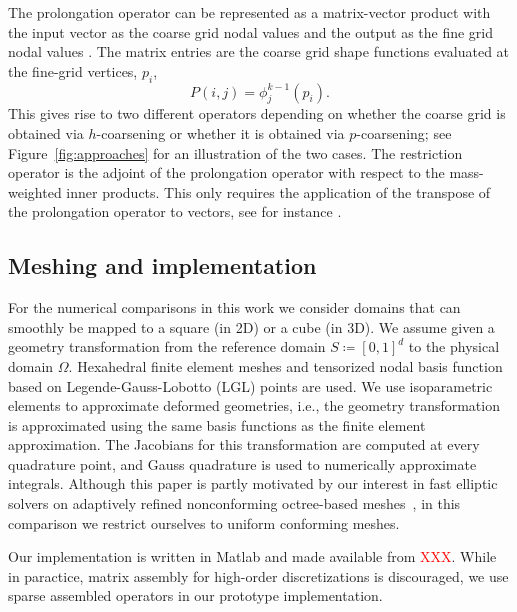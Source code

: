 \documentclass[smallcondensed,final]{svjour3}     %
\newcommand{\todo}[1]{\textcolor{red}{ #1}}
\begin{document}
The prolongation operator can be represented as a matrix-vector
product with the input vector as the coarse grid nodal values and the
output as the fine grid nodal values \cite{SampathBiros10}. The matrix
entries are the coarse grid shape functions evaluated at the fine-grid
vertices, $p_i$,
\begin{equation}
	\label{eq:Pstencil}
	P(i,j) = \phi_j^{k-1}(p_i). 
\end{equation}
This gives rise to two different operators depending on whether the
coarse grid is obtained via $h$-coarsening or whether it is obtained
via $p$-coarsening; see Figure~\ref{fig:approaches} for an
illustration of the two cases. The restriction operator is the adjoint
of the prolongation operator with respect to the mass-weighted inner
products. This only requires the application of the transpose of the
prolongation operator to vectors, see for instance
\cite{SampathBiros10}.


\subsection{Meshing and implementation} %
\label{sub:meshing}

For the numerical comparisons in this work we consider domains that
can smoothly be mapped to a square (in 2D) or a cube (in 3D). We
assume given a geometry transformation from the reference domain
$S\coloneqq[0,1]^d$ to the physical domain $\Omega$. Hexahedral finite
element meshes and tensorized nodal basis function based on
Legende-Gauss-Lobotto (LGL) points are used.  We use isoparametric
elements to approximate deformed geometries, i.e., the geometry
transformation is approximated using the same basis functions as the
finite element approximation. The Jacobians for this transformation
are computed at every quadrature point, and Gauss quadrature is used
to numerically approximate integrals.  Although this paper is partly
motivated by our interest in fast elliptic solvers on adaptively
refined nonconforming octree-based
meshes~\cite{SundarBirosBursteddeEtAl12, SampathBiros10}, in this
comparison we restrict ourselves to uniform conforming meshes.

Our implementation is written in Matlab and made available from
\todo{XXX}. While in paractice, matrix assembly for
high-order discretizations is discouraged, we use sparse
assembled operators in our prototype implementation.
\end{document}
